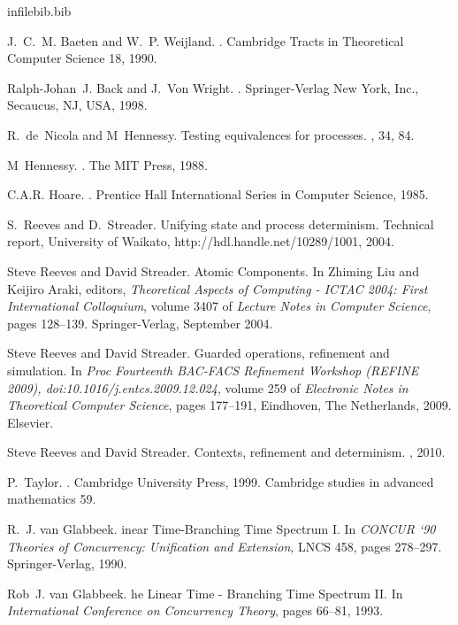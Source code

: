 \documentclass[]{article}
\begin{document}
\begin{thebibliography} {infilebib.bib}

J.~C.~M. Baeten and W.~P. Weijland.
.
\newblock Cambridge Tracts in Theoretical Computer Science 18, 1990.

Ralph-Johan~J. Back and J.~Von Wright.
.
\newblock Springer-Verlag New York, Inc., Secaucus, NJ, USA, 1998.


R.~de~Nicola and M~Hennessy.
\newblock Testing equivalences for processes.
, 34, 84.


M~Hennessy.
.
\newblock The MIT Press, 1988.

C.A.R. Hoare.
.
\newblock Prentice Hall International Series in Computer Science, 1985.



S.~Reeves and D.~Streader.
\newblock Unifying state and process determinism.
\newblock Technical report, University of Waikato,
  http://hdl.handle.net/10289/1001, 2004.

Steve Reeves and David Streader.
\newblock Atomic {C}omponents.
\newblock In Zhiming Liu and Keijiro Araki, editors, {\em Theoretical Aspects
  of Computing - ICTAC 2004: First International Colloquium}, volume 3407 of
  {\em Lecture Notes in Computer Science}, pages 128--139. Springer-Verlag,
  September 2004.

Steve Reeves and David Streader.
\newblock Guarded operations, refinement and simulation.
\newblock In {\em Proc Fourteenth BAC-FACS Refinement Workshop (REFINE 2009),
  doi:10.1016/j.entcs.2009.12.024}, volume 259 of {\em Electronic Notes in
  Theoretical Computer Science}, pages 177--191, Eindhoven, The Netherlands,
  2009. Elsevier.

Steve Reeves and David Streader.
\newblock Contexts, refinement and determinism.
, 2010.


P.~Taylor.
.
\newblock Cambridge University Press, 1999.
\newblock Cambridge studies in advanced mathematics 59.

R.~J. van Glabbeek.
inear {T}ime-{B}ranching {T}ime {S}pectrum {I}.
\newblock In {\em {CONCUR} `90 Theories of Concurrency: Unification and
  Extension}, LNCS 458, pages 278--297. Springer-Verlag, 1990.

Rob~J. van Glabbeek.
he {L}inear {T}ime - {B}ranching {T}ime {S}pectrum {II}.
\newblock In {\em International Conference on Concurrency Theory}, pages
  66--81, 1993.


\end{thebibliography}
\end{document}
